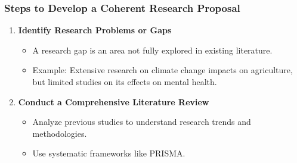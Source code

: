 \documentclass[aspectratio=169]{beamer}
\begin{document}
\begin{frame}[fragile]
    \frametitle{Steps to Develop a Coherent Research Proposal}
    \begin{enumerate}
        \item \textbf{Identify Research Problems or Gaps}
            \begin{itemize}
                \item A research gap is an area not fully explored in existing literature.
                \item Example: Extensive research on climate change impacts on agriculture, but limited studies on its effects on mental health.
            \end{itemize}

        \item \textbf{Conduct a Comprehensive Literature Review}
            \begin{itemize}
                \item Analyze previous studies to understand research trends and methodologies.
                \item Use systematic frameworks like PRISMA.
            \end{itemize}
    \end{enumerate}
\end{frame}
\end{document}
